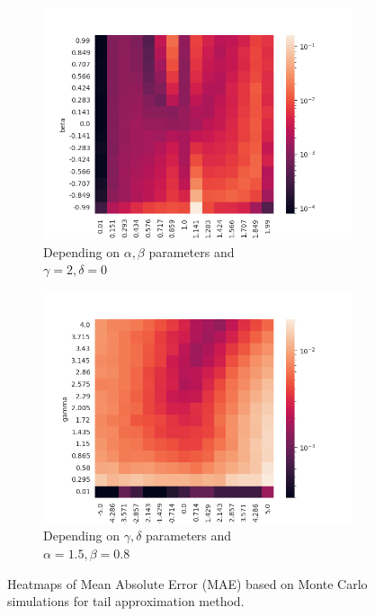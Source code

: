 \documentclass{article}
\begin{document}
		\begin{figure}[H]
			\begin{subfigure}{.5\textwidth}
				\centering
				\includegraphics[width=1\linewidth]{images/heatmap_cdf_MAE_alpha_beta.png}
				\caption{Depending on $\alpha, \beta$ parameters and \\$\gamma = 2, \delta = 0$}
			\end{subfigure}
			\begin{subfigure}[r]{.5\textwidth}
				\centering
				\includegraphics[width=1\linewidth]{images/heatmap_cdf_MAE_gamma_delta.png}
				\caption{Depending on $\gamma, \delta$ parameters and \\$\alpha = 1.5, \beta = 0.8$}
			\end{subfigure}
			\caption{Heatmaps of Mean Absolute Error (MAE) based on Monte Carlo simulations for tail approximation method.}

		\end{figure}
\end{document}
